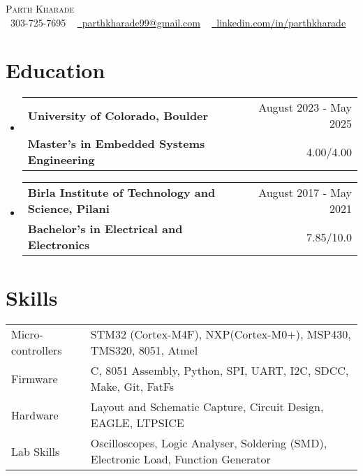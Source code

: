 \documentclass[a4,11pt]{article}
\makeatletter
\newcommand{\resumeSubheading}[4]{
  \vspace{-2pt}\item
    \begin{tabular*}{1.0\textwidth}[t]{l@{\extracolsep{\fill}}r}
       {\large \textbf{#1}} &  {\large #2} \\
      \textbf{#3} & { #4} \\
    \end{tabular*}\vspace{-1pt}
}
\newcommand{\resumeSubHeadingListStart}{\begin{itemize}[leftmargin=0.0in, label={}]}
\newcommand{\resumeSubHeadingListEnd}{\end{itemize}}
\makeatother
\begin{document}
\begin{center}
    {\Huge \scshape Parth Kharade} \\ \vspace{1pt}
    \small \raisebox{-0.1\height}\faPhone\ 303-725-7695 ~ \href{mailto:parthkharade99@gmail.com}{\raisebox{-0.2\height}\faEnvelope\  \underline{parthkharade99@gmail.com}} ~ 
    \href{https://www.linkedin.com/in/parth-k-081287184/}{\raisebox{-0.2\height}\faLinkedin\ \underline{linkedin.com/in/parthkharade}}  ~
    \vspace{-16pt}
\end{center}


\section{Education}
  \resumeSubHeadingListStart
    \resumeSubheading
      {University of Colorado, Boulder}{August 2023 - May 2025}
      {Master's in Embedded Systems Engineering}{4.00/4.00}
    \resumeSubheading
      {Birla Institute of Technology and Science, Pilani}{August 2017 - May 2021}
      {Bachelor's in Electrical and Electronics}{7.85/10.0}
  \resumeSubHeadingListEnd
 \vspace{-16pt}
 \section{Skills}
 \vspace{-4mm}
\begin{table}[!htb]
    \begin{tabular}{ m{3.1cm} | m{16cm} } 
      {Micro-controllers}&{\: STM32 (Cortex-M4F), NXP(Cortex-M0+), MSP430, TMS320, 8051, Atmel} \\
      {Firmware}&{\: C, 8051 Assembly, Python, SPI, UART, I2C, SDCC, Make, Git, FatFs} \\
      {Hardware}&{\: Layout and Schematic Capture, Circuit Design, EAGLE, LTPSICE} \\
      {Lab Skills}&{\: Oscilloscopes, Logic Analyser, Soldering (SMD), Electronic Load, Function Generator} \\
    \end{tabular}
\end{table}
 \vspace{-16pt}

\end{document}
